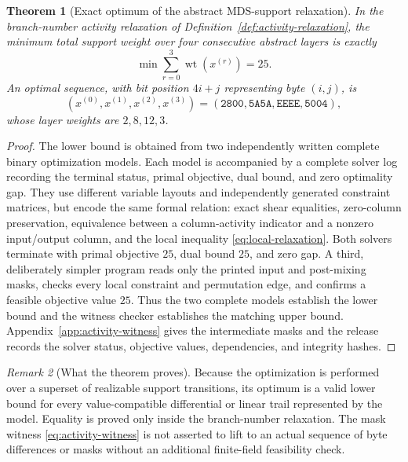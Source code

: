 \documentclass[10pt,reqno]{amsart}
\theoremstyle{plain}
\newtheorem{theorem}{Theorem}[section]
\theoremstyle{remark}\newtheorem{remark}[theorem]{Remark}
\theoremstyle{definition}\newtheorem{definition}[theorem]{Definition}
\begin{document}
\begin{theorem}[Exact optimum of the abstract MDS-support relaxation]\label{thm:wide25}
In the branch-number activity relaxation of Definition~\ref{def:activity-relaxation}, the minimum total support weight over four consecutive abstract layers is exactly
\[
\min\sum_{r=0}^{3}\operatorname{wt}(x^{(r)})=25.
\]
An optimal sequence, with bit position $4i+j$ representing byte $(i,j)$, is
\begin{equation}
(x^{(0)},x^{(1)},x^{(2)},x^{(3)})
=(\mathtt{2800},\mathtt{5A5A},\mathtt{EEEE},\mathtt{5004}),
\label{eq:activity-witness}
\end{equation}
whose layer weights are $2,8,12,3$.
\end{theorem}
\begin{proof}
The lower bound is obtained from two independently written complete binary optimization models.  Each model is accompanied by a complete solver log recording the terminal status, primal objective, dual bound, and zero optimality gap. They use different variable layouts and independently generated constraint matrices, but encode the same formal relation: exact shear equalities, zero-column preservation, equivalence between a column-activity indicator and a nonzero input/output column, and the local inequality \eqref{eq:local-relaxation}. Both solvers terminate with primal objective $25$, dual bound $25$, and zero gap. A third, deliberately simpler program reads only the printed input and post-mixing masks, checks every local constraint and permutation edge, and confirms a feasible objective value $25$. Thus the two complete models establish the lower bound and the witness checker establishes the matching upper bound. Appendix~\ref{app:activity-witness} gives the intermediate masks and the release records the solver status, objective values, dependencies, and integrity hashes.
\end{proof}

\begin{remark}[What the theorem proves]
Because the optimization is performed over a superset of realizable support transitions, its optimum is a valid lower bound for every value-compatible differential or linear trail represented by the model. Equality is proved only inside the branch-number relaxation. The mask witness \eqref{eq:activity-witness} is not asserted to lift to an actual sequence of byte differences or masks without an additional finite-field feasibility check.
\end{remark}
\end{document}
